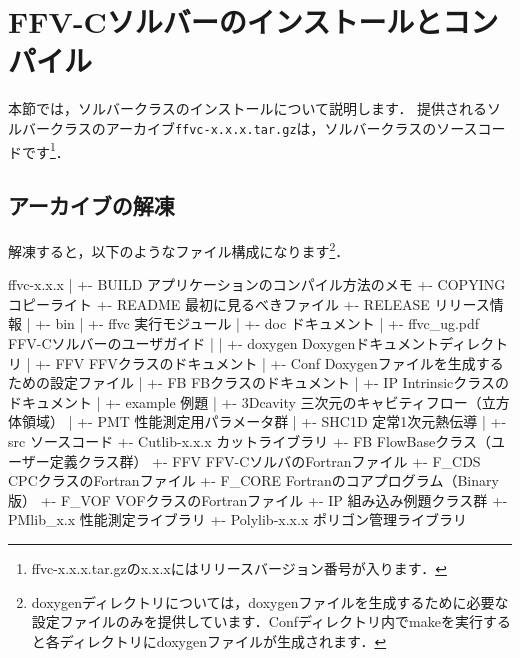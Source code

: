 {\small
{}
}



\hypertarget{tgt:installFFV-C}{\section{FFV-Cソルバーのインストールとコンパイル}}

本節では，ソルバークラスのインストールについて説明します．
提供されるソルバークラスのアーカイブ\verb|ffvc-x.x.x.tar.gz|は，ソルバークラスのソースコードです\footnote{ffvc-x.x.x.tar.gzのx.x.xにはリリースバージョン番号が入ります．}．

\subsection{アーカイブの解凍}
{\small
{}
}

解凍すると，以下のようなファイル構成になります\footnote{doxygenディレクトリについては，doxygenファイルを生成するために必要な設定ファイルのみを提供しています．Confディレクトリ内でmakeを実行すると各ディレクトリにdoxygenファイルが生成されます．}．

{ \small
\begin{program}
ffvc-x.x.x
  |
  +- BUILD                        アプリケーションのコンパイル方法のメモ
  +- COPYING                      コピーライト
  +- README                       最初に見るべきファイル
  +- RELEASE                      リリース情報
  |
  +- bin                          
  |   +- ffvc                     実行モジュール
  |
  +- doc                          ドキュメント
  |   +- ffvc_ug.pdf              FFV-Cソルバーのユーザガイド
  |   
  |
  +- doxygen                      Doxygenドキュメントディレクトリ
  |   +- FFV                      FFVクラスのドキュメント
  |   +- Conf                     Doxygenファイルを生成するための設定ファイル
  |   +- FB                       FBクラスのドキュメント
  |   +- IP                       Intrinsicクラスのドキュメント
  |
  +- example                      例題
  |   +- 3Dcavity                 三次元のキャビティフロー（立方体領域）
  |   +- PMT                      性能測定用パラメータ群
  |   +- SHC1D                    定常1次元熱伝導
  |
  +- src                          ソースコード
      +- Cutlib-x.x.x             カットライブラリ
      +- FB                       FlowBaseクラス（ユーザー定義クラス群）
      +- FFV                      FFV-CソルバのFortranファイル
      +- F_CDS                    CPCクラスのFortranファイル
      +- F_CORE                   Fortranのコアプログラム（Binary版）
      +- F_VOF                    VOFクラスのFortranファイル
      +- IP                       組み込み例題クラス群
      +- PMlib_x.x	             性能測定ライブラリ
      +- Polylib-x.x.x             ポリゴン管理ライブラリ

\end{program}
}

